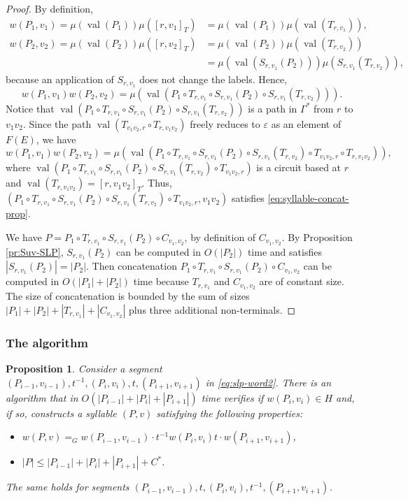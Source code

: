 \documentclass[12pt,oneside]{amsart}
\newtheorem{proposition}[theorem]{Proposition}
\theoremstyle{definition}
\theoremstyle{case}
\DeclareMathOperator{\val}{val}
\begin{document}
\begin{proof}
By definition,
\begin{align*}
w(P_1,v_1) = \mu(\val(P_1)) \mu([r,v_1]_T) 
&= 
\mu(\val(P_1)) \mu(\val(T_{r,v_1})),\\
w(P_2,v_2) = \mu(\val(P_2)) \mu([r,v_2]_T) 
&= \mu(\val(P_2)) \mu(\val(T_{r,v_2}))\\
&= \mu(\val(S_{r,v_1}(P_2))) \mu(S_{r,v_1}(T_{r,v_2})),
\end{align*}
because an application of $S_{r,v_1}$ does not change the labels.
Hence, 
$$
w(P_1,v_1)w(P_2,v_2) =
\mu(\val(P_1 \circ T_{r,v_1} \circ S_{r,v_1}(P_2) \circ S_{r,v_1}(T_{r,v_2}))).
$$
Notice that 
$\val(P_1 \circ T_{r,v_1} \circ S_{r,v_1}(P_2) \circ S_{r,v_1}(T_{r,v_2}))$
is a path
in $\Gamma^\ast$ from $r$ to $v_1v_2$.
Since the path $\val(T_{v_1v_2,r} \circ T_{r,v_1v_2})$
freely reduces to $\varepsilon$ as an element of $F(E)$, we have
$$
w(P_1,v_1)w(P_2,v_2) =
\mu(\val(P_1 \circ 
T_{r,v_1} \circ
S_{r,v_1}(P_2) \circ
S_{r,v_1}(T_{r,v_2}) \circ
T_{v_1v_2,r} \circ
T_{r,v_1v_2})),
$$
where $\val(P_1 \circ 
T_{r,v_1} \circ
S_{r,v_1}(P_2) \circ
S_{r,v_1}(T_{r,v_2}) \circ
T_{v_1v_2,r})$ 
is a circuit based at $r$ and 
$\val(T_{r,v_1v_2}) = [r,v_1v_2]_T$.
Thus, $(P_1 \circ 
T_{r,v_1} \circ
S_{r,v_1}(P_2) \circ
S_{r,v_1}(T_{r,v_2}) \circ
T_{v_1v_2,r},v_1v_2)$ satisfies \eqref{eq:syllable-concat-prop}.

We have $P = P_1 \circ T_{r,v_1} \circ S_{r,v_1}(P_2) \circ C_{v_1,v_2}$,
by definition of $C_{v_1,v_2}$.
By Proposition \ref{pr:Suv-SLP}, $S_{r,v_1}(P_2)$
can be computed in $O(|P_2|)$ time and 
satisfies $|S_{r,v_1}(P_2)| = |P_2|$.
Then concatenation 
$P_1 \circ T_{r,v_1} \circ S_{r,v_1}(P_2) \circ C_{v_1,v_2}$
can be computed in $O(|P_1|+|P_2|)$ time because
$T_{r,v_1}$ and $C_{v_1,v_2}$ are of constant size.
The size of concatenation is bounded by the sum of sizes
$|P_1| + |P_2| + |T_{r,v_1}| + |C_{v_1,v_2}|$ plus three
additional non-terminals.
\end{proof}


\subsubsection{The algorithm}

\begin{proposition}\label{pr:main-step-case-II}
Consider a segment $(P_{i-1},v_{i-1}),t^{-1},(P_i,v_i),t,(P_{i+1},v_{i+1})$ 
in \eqref{eq:slp-word2}.
There is an algorithm that in $O(|P_{i-1}|+|P_{i}|+|P_{i+1}|)$ time
verifies if $w(P_i,v_i) \in H$ and, if so, constructs
a syllable $(P,v)$ satisfying the following properties:
\begin{itemize}
\item[(a)]
$w(P,v) =_G
w(P_{i-1},v_{i-1})
\cdot
t^{-1} w(P_{i},v_{i}) t
\cdot
w(P_{i+1},v_{i+1})$,
\item[(b)]
$|P| \le |P_{i-1}| + |P_i| + |P_{i+1}| + C^\ast$.
\end{itemize}
The same holds for segments 
$(P_{i-1},v_{i-1}),t,(P_i,v_i),t^{-1},(P_{i+1},v_{i+1})$.
\end{proposition}
\end{document}
